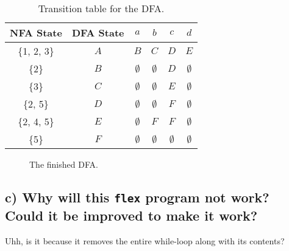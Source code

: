 \documentclass[12pt]{article}
\begin{document}
\begin{table}[H]
\begin{center}
	\begin{tabular}{|c c | c | c | c | c|}
	\hline
	NFA State & DFA State & $a$ & $b$ & $c$ & $d$ \\
	\hline \hline
	\{1, 2, 3\} & $A$ & $B$ & $C$ & $D$ & $E$ \\
	\hline 
	\{2\} & $B$ & $\emptyset$ & $\emptyset$ & $D$ & $\emptyset$ \\
	\hline 
	\{3\} & $C$ & $\emptyset$ & $\emptyset$ & $E$ & $\emptyset$ \\
	\hline 
	\{2, 5\} & $D$ & $\emptyset$ & $\emptyset$ & $F$ & $\emptyset$ \\
	\hline 
	\{2, 4, 5\} & $E$ & $\emptyset$ & $F$ & $F$ & $\emptyset$ \\
	\hline 
	\{5\} & $F$ & $\emptyset$ & $\emptyset$ & $\emptyset$ & $\emptyset$ \\
	\hline 
	\end{tabular} 
	\label{tab:1-1-b-tt}
	\caption{Transition table for the DFA.}
\end{center}
\end{table}

\begin{figure}[H]
\begin{center}
	
	\caption{The finished DFA.}
	\label{fig:1-1-b}
\end{center}
\end{figure}


\subsection{c) Why will this \texttt{flex} program not work? Could it be improved to make it work?}
Uhh, is it because it removes the entire while-loop along with its contents?
\end{document}
